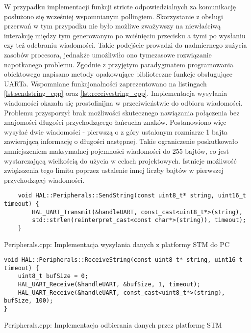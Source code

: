 W przypadku implementacji funkcji stricte odpowiedzialnych za komunikację posłużono się wcześniej
wspomnianym pollingiem. Skorzystanie z obsługi przerwań w tym przypadku nie było możliwe zważywszy na
niewłaściwą interakcję między tym generowanym po wciśnięciu przecisku a tymi po wysłaniu czy też odebraniu
wiadomości. Takie podejście prowadzi do nadmiernego zużycia zasobów procesora, jednakże umożliwiło ono 
tymczasowe rozwiązanie napotkanego problemu. Zgodnie z przyjętym paradygmatem programowania obiektowego
napisano metody opakowujące biblioteczne funkcje obsługujące UARTa. Wspomniane funkcjonalności
zaprezentowano na listingach \ref{lst:sendstring_cpp} oraz \ref{lst:receivestring_cpp}. Implementacja
wysyłania wiadomości okazała się prostolinijna w przeciwieństwie do odbioru wiadomości. Problemu
przysporzył brak możliwości skutecznego nawiązania połączenia bez znajomości długości przychodzącego
łańcucha znaków. Postanowiono więc wysyłać dwie wiadomości - pierwszą o z góry ustalonym rozmiarze
1 bajta zawierającą informację o długości następnej. Takie ograniczenie poskutkowało zmniejszeniem
maksymalnej pojemności wiadomości do 255 bajtów, co jest wystarczającą wielkością do użycia w celach
projektowych. Istnieje możliwość zwiększenia tego limitu poprzez ustalenie innej liczby bajtów w pierwszej
przychodzącej wiadomości. 
\begin{listing}[htb]
\begin{verbatim}
    void HAL::Peripherals::SendString(const uint8_t* string, uint16_t timeout) {
        HAL_UART_Transmit(&handleUART, const_cast<uint8_t*>(string),
        std::strlen(reinterpret_cast<const char*>(string)), timeout);
    }
    \end{verbatim}
    \caption{Peripherals.cpp: Implementacja wysyłania danych z platformy STM do PC}
    \label{lst:sendstring_cpp}
\end{listing}

\begin{listing}[htb]
\begin{verbatim}
void HAL::Peripherals::ReceiveString(const uint8_t* string, uint16_t timeout) {
    uint8_t bufSize = 0;
    HAL_UART_Receive(&handleUART, &bufSize, 1, timeout);
    HAL_UART_Receive(&handleUART, const_cast<uint8_t*>(string), bufSize, 100);
}
\end{verbatim}
\caption{Peripherals.cpp: Implementacja odbierania danych przez platformę STM}
\label{lst:receivestring_cpp}
\end{listing}

